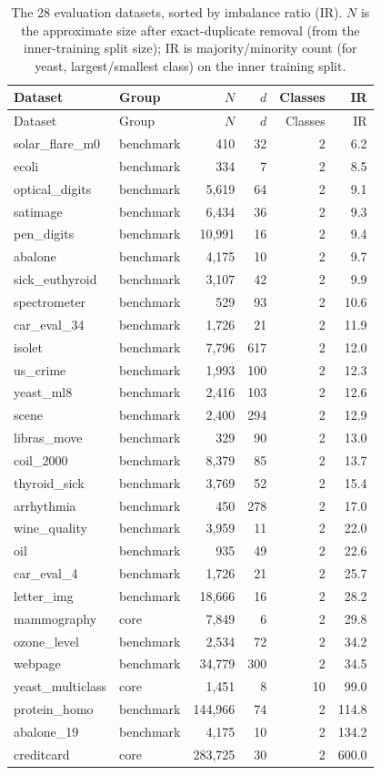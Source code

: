 \begin{longtable}{llrrrr}
\caption{The 28 evaluation datasets, sorted by imbalance ratio (IR). $N$ is the approximate size after exact-duplicate removal (from the inner-training split size); IR is majority/minority count (for yeast, largest/smallest class) on the inner training split.}\label{tab:datasets}\\
\toprule
Dataset & Group & $N$ & $d$ & Classes & IR \\
\midrule
\endfirsthead
\toprule
Dataset & Group & $N$ & $d$ & Classes & IR \\
\midrule
\endhead
solar\_flare\_m0 & benchmark & 410 & 32 & 2 & 6.2 \\
ecoli & benchmark & 334 & 7 & 2 & 8.5 \\
optical\_digits & benchmark & 5,619 & 64 & 2 & 9.1 \\
satimage & benchmark & 6,434 & 36 & 2 & 9.3 \\
pen\_digits & benchmark & 10,991 & 16 & 2 & 9.4 \\
abalone & benchmark & 4,175 & 10 & 2 & 9.7 \\
sick\_euthyroid & benchmark & 3,107 & 42 & 2 & 9.9 \\
spectrometer & benchmark & 529 & 93 & 2 & 10.6 \\
car\_eval\_34 & benchmark & 1,726 & 21 & 2 & 11.9 \\
isolet & benchmark & 7,796 & 617 & 2 & 12.0 \\
us\_crime & benchmark & 1,993 & 100 & 2 & 12.3 \\
yeast\_ml8 & benchmark & 2,416 & 103 & 2 & 12.6 \\
scene & benchmark & 2,400 & 294 & 2 & 12.9 \\
libras\_move & benchmark & 329 & 90 & 2 & 13.0 \\
coil\_2000 & benchmark & 8,379 & 85 & 2 & 13.7 \\
thyroid\_sick & benchmark & 3,769 & 52 & 2 & 15.4 \\
arrhythmia & benchmark & 450 & 278 & 2 & 17.0 \\
wine\_quality & benchmark & 3,959 & 11 & 2 & 22.0 \\
oil & benchmark & 935 & 49 & 2 & 22.6 \\
car\_eval\_4 & benchmark & 1,726 & 21 & 2 & 25.7 \\
letter\_img & benchmark & 18,666 & 16 & 2 & 28.2 \\
mammography & core & 7,849 & 6 & 2 & 29.8 \\
ozone\_level & benchmark & 2,534 & 72 & 2 & 34.2 \\
webpage & benchmark & 34,779 & 300 & 2 & 34.5 \\
yeast\_multiclass & core & 1,451 & 8 & 10 & 99.0 \\
protein\_homo & benchmark & 144,966 & 74 & 2 & 114.8 \\
abalone\_19 & benchmark & 4,175 & 10 & 2 & 134.2 \\
creditcard & core & 283,725 & 30 & 2 & 600.0 \\
\bottomrule
\end{longtable}